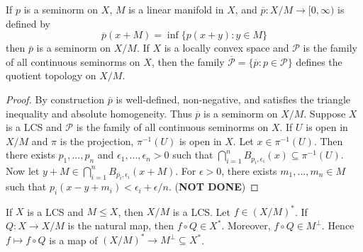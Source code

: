 \begin{prop}
    If $p$ is a seminorm on $X$, $M$ is a linear manifold in $X$, and $\overline{p}:X/M\rightarrow [0,\infty)$ is defined by $$\overline{p}(x+M)=\inf\{p(x+y):y \in M\}$$
    then $\overline{p}$ is a seminorm on $X/M$. If $X$ is a locally convex space and $\mathscr{P}$ is the family of all continuous seminorms on $X$, then the family $\overline{\mathscr{P}} = \{\overline{p}: p \in \mathscr{P}\}$ defines the quotient topology on $X/M$.
\end{prop}
\begin{proof}
    By construction $\overline{p}$ is well-defined, non-negative, and satisfies the triangle inequality and absolute homogeneity. Thus $\overline{p}$ is a seminorm on $X/M$. Suppose $X$ is a LCS and $\mathscr{P}$ is the family of all continuous seminorms on $X$. If $U$ is open in $X/M$ and $\pi$ is the projection, $\pi^{-1}(U)$ is open in $X$. Let $x \in \pi^{-1}(U)$. Then there exists $p_1,...,p_n$ and $\epsilon_1,...,\epsilon_n > 0$ such that $\bigcap_{i=1}^nB_{p_i,\epsilon_i}(x) \subseteq \pi^{-1}(U)$. Now let $y+M \in \bigcap_{i=1}^nB_{\overline{p_i},\epsilon_i}(x+M)$. For $\epsilon > 0$, there exists $m_1,...,m_n \in M$ such that $p_i(x-y+m_i) < \epsilon_i + \epsilon/n$. (\textbf{NOT DONE})
\end{proof}

If $X$ is a LCS and $M \leq X$, then $X/M$ is a LCS. Let $f \in (X/M)^*$. If $Q:X\rightarrow X/M$ is the natural map, then $f\circ Q \in X^*$. Moreover, $f\circ Q \in M^{\perp}$. Hence $f\mapsto f\circ Q$ is a map of $(X/M)^*\rightarrow M^{\perp}\subseteq X^*$.

